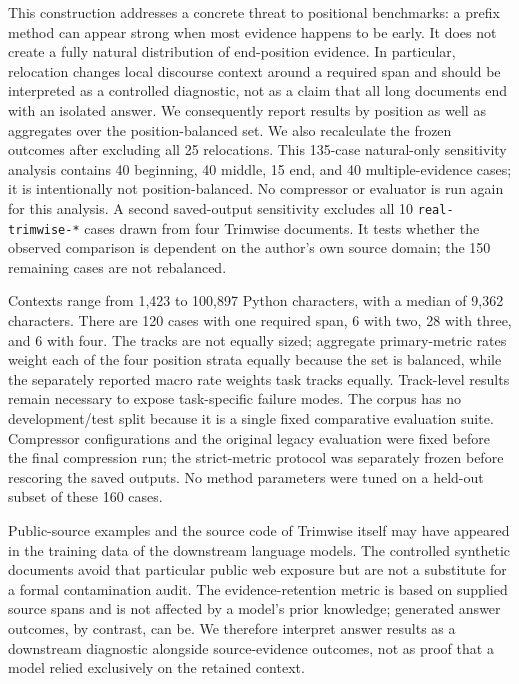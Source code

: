 \documentclass[
]{article}
\begin{document}
This construction addresses a concrete threat to positional benchmarks:
a prefix method can appear strong when most evidence happens to be
early. It does not create a fully natural distribution of end-position
evidence. In particular, relocation changes local discourse context
around a required span and should be interpreted as a controlled
diagnostic, not as a claim that all long documents end with an isolated
answer. We consequently report results by position as well as aggregates
over the position-balanced set. We also recalculate the frozen outcomes after
excluding all 25 relocations. This 135-case natural-only sensitivity
analysis contains 40 beginning, 40 middle, 15 end, and 40 multiple-evidence
cases; it is intentionally not position-balanced. No compressor or evaluator
is run again for this analysis. A second saved-output sensitivity excludes all
10 \texttt{real-trimwise-*} cases drawn from four Trimwise documents. It tests
whether the observed comparison is dependent on the author's own source domain;
the 150 remaining cases are not rebalanced.

Contexts range from 1,423 to 100,897 Python characters, with a median of
9,362 characters. There are 120 cases with one required span, 6 with
two, 28 with three, and 6 with four. The tracks are not equally sized;
aggregate primary-metric rates weight each of the four position strata
equally because the set is balanced, while the separately reported macro
rate weights task tracks equally. Track-level results remain necessary
to expose task-specific failure modes. The corpus has no
development/test split because it is a single fixed comparative
evaluation suite. Compressor configurations and the original legacy
evaluation were fixed before the final compression run; the strict-metric
protocol was separately frozen before rescoring the saved outputs. No
method parameters were tuned on a held-out subset of these 160 cases.

Public-source examples and the source code of Trimwise itself may have
appeared in the training data of the downstream language models. The
controlled synthetic documents avoid that particular public web exposure
but are not a substitute for a formal contamination audit. The
evidence-retention metric is based on supplied source spans and is not
affected by a model's prior knowledge; generated answer outcomes, by
contrast, can be. We therefore interpret answer results as a downstream
diagnostic alongside source-evidence outcomes, not as proof that a model
relied exclusively on the retained context.
\end{document}

